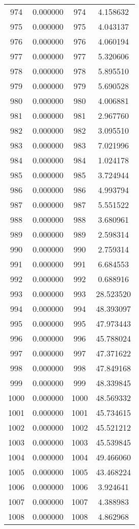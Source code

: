 \documentclass[12pt]{article}
\begin{document}
\begin{longtable}{@{}cccc@{}}
974 & 0.000000 & 974 & 4.158632 \\
975 & 0.000000 & 975 & 4.043137 \\
976 & 0.000000 & 976 & 4.060194 \\
977 & 0.000000 & 977 & 5.320606 \\
978 & 0.000000 & 978 & 5.895510 \\
979 & 0.000000 & 979 & 5.690528 \\
980 & 0.000000 & 980 & 4.006881 \\
981 & 0.000000 & 981 & 2.967760 \\
982 & 0.000000 & 982 & 3.095510 \\
983 & 0.000000 & 983 & 7.021996 \\
984 & 0.000000 & 984 & 1.024178 \\
985 & 0.000000 & 985 & 3.724944 \\
986 & 0.000000 & 986 & 4.993794 \\
987 & 0.000000 & 987 & 5.551522 \\
988 & 0.000000 & 988 & 3.680961 \\
989 & 0.000000 & 989 & 2.598314 \\
990 & 0.000000 & 990 & 2.759314 \\
991 & 0.000000 & 991 & 6.684553 \\
992 & 0.000000 & 992 & 0.688916 \\
993 & 0.000000 & 993 & 28.523520 \\
994 & 0.000000 & 994 & 48.393097 \\
995 & 0.000000 & 995 & 47.973443 \\
996 & 0.000000 & 996 & 45.788024 \\
997 & 0.000000 & 997 & 47.371622 \\
998 & 0.000000 & 998 & 47.849168 \\
999 & 0.000000 & 999 & 48.339845 \\
1000 & 0.000000 & 1000 & 48.569332 \\
1001 & 0.000000 & 1001 & 45.734615 \\
1002 & 0.000000 & 1002 & 45.521212 \\
1003 & 0.000000 & 1003 & 45.539845 \\
1004 & 0.000000 & 1004 & 49.466060 \\
1005 & 0.000000 & 1005 & 43.468224 \\
1006 & 0.000000 & 1006 & 3.924641 \\
1007 & 0.000000 & 1007 & 4.388983 \\
1008 & 0.000000 & 1008 & 4.862968 \\

\end{longtable}
\end{document}
